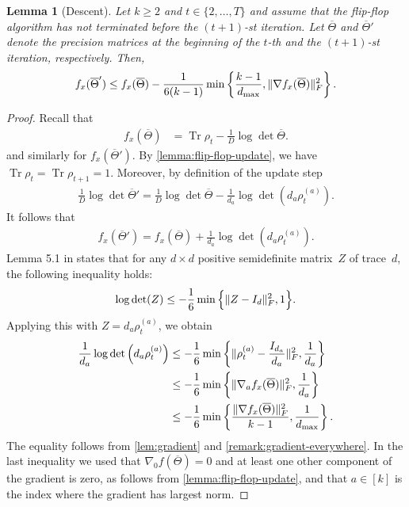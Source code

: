 \documentclass[aos]{imsart}
\newtheorem{lemma}[theorem]{Lemma}
\theoremstyle{definition}
\numberwithin{equation}{section}
\DeclareMathOperator{\tr}{Tr}
\DeclarePairedDelimiter{\norm}{\lVert}{\rVert}
\newcommand{\otheta}{\overline{\Theta}}
\def\dmax{d_{\max}}
\begin{document}
\begin{lemma}[Descent]\label{lem:tensor-descent-lemma}
  Let $k \geq 2$ and $t\in\{2,\dots,T\}$ and assume that the flip-flop algorithm has not terminated before the $(t+1)$-st iteration.
  Let $\otheta$ and $\otheta'$ denote the precision matrices at the beginning of the $t$-th and the $(t+1)$-st iteration, respectively.
  Then,
  \begin{align*}
    f_x(\otheta') \leq f_x(\otheta) - \frac1{6(k-1)} \min \left\{ \frac{k-1}{\dmax}, \norm{\nabla f_x(\otheta)}_F^2 \right\}.
  \end{align*}
\end{lemma}
\begin{proof}
  Recall that
  \begin{align*}
    f_x(\otheta) &= \tr\rho_t - \frac1D\log\det\otheta.
  \end{align*}
  and similarly for $f_x(\otheta')$.
  By \cref{lemma:flip-flop-update}, we have $\tr\rho_t = \tr\rho_{t+1} = 1$.
  Moreover, by definition of the update step
  \begin{align*}
    \frac1D\log\det\otheta' = \frac1D\log\det\otheta - \frac1{d_a}\log\det\left(d_a \rho_t^{(a)}\right).
  \end{align*}
  It follows that
  \begin{align*}
    f_x(\otheta') = f_x(\otheta) + \frac1{d_a}\log\det\left(d_a \rho_t^{(a)} \right).
  \end{align*}
  Lemma 5.1 in \cite{GGOW19} states that for any $d\times d$ positive semidefinite matrix~$Z$ of trace~$d$, the following inequality holds:
  \begin{align*}
    \log\det(Z) \leq -\frac16 \min \, \Bigl\{ \norm{Z - I_d}_F^2, 1 \Bigr\}.
  \end{align*}
  Applying this with $Z = d_a \rho_t^{(a)}$, we obtain
  \begin{align*}
    \frac1{d_a}\log\det\left(d_a \rho_t^{(a)} \right)
  &\leq -\frac16 \min\left\{ \norm{\rho_t^{(a)} - \frac{I_{d_a}}{d_a}}_F^2, \frac1{d_a} \right\} \\
  &\leq -\frac16 \min\left\{ \norm{\nabla_a f_x(\otheta)}_F^2, \frac1{d_a} \right\} \\
  &\leq -\frac16 \min\left\{ \frac{\norm{\nabla f_x(\otheta)}_F^2}{k-1}, \frac1{d_{\max}} \right\}.
  \end{align*}
  The equality follows from \cref{lem:gradient} and \cref{remark:gradient-everywhere}.
  In the last inequality we used that $\nabla_0 f(\otheta) = 0$ and at least one other component of the gradient is zero, as follows from \cref{lemma:flip-flop-update}, and that $a\in[k]$ is the index where the gradient has largest norm.
\end{proof}
\end{document}
